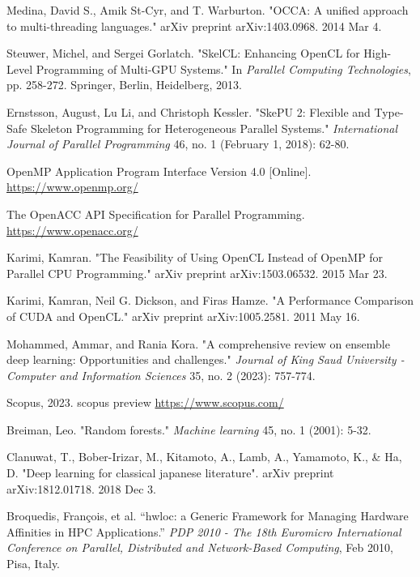 \documentclass[13pt]{article}
\begin{document}
\begin{thebibliography}{9}
    Medina, David S., Amik St-Cyr, and T. Warburton. 
    "OCCA: A unified approach to multi-threading languages."
    arXiv preprint arXiv:1403.0968. 2014 Mar 4.


    Steuwer, Michel, and Sergei Gorlatch.
    "SkelCL: Enhancing OpenCL for High-Level Programming of Multi-GPU Systems."
    In \textit{Parallel Computing Technologies}, pp. 258-272. Springer, Berlin, Heidelberg, 2013.

    Ernstsson, August, Lu Li, and Christoph Kessler.
    "SkePU 2: Flexible and Type-Safe Skeleton Programming for Heterogeneous Parallel Systems."
    \textit{International Journal of Parallel Programming} 46, no. 1 (February 1, 2018): 62-80.


    OpenMP Application Program Interface Version 4.0 [Online].
    \url{https://www.openmp.org/}


    The OpenACC API Specification for Parallel Programming.
    \url{https://www.openacc.org/}

    Karimi, Kamran.
    "The Feasibility of Using OpenCL Instead of OpenMP for Parallel CPU Programming."
    arXiv preprint arXiv:1503.06532. 2015 Mar 23.


    Karimi, Kamran, Neil G. Dickson, and Firas Hamze.
    "A Performance Comparison of CUDA and OpenCL."
    arXiv preprint arXiv:1005.2581. 2011 May 16.

    Mohammed, Ammar, and Rania Kora.
    "A comprehensive review on ensemble deep learning: Opportunities and challenges."
    \textit{Journal of King Saud University - Computer and Information Sciences} 35, no. 2 (2023): 757-774.

    Scopus, 2023. scopus preview
    \url{https://www.scopus.com/}

    Breiman, Leo.
    "Random forests."
    \textit{Machine learning} 45, no. 1 (2001): 5-32.

    Clanuwat, T., Bober-Irizar, M., Kitamoto, A., Lamb, A., Yamamoto, K., \& Ha, D.
    "Deep learning for classical japanese literature".
    arXiv preprint arXiv:1812.01718. 2018 Dec 3.

    Broquedis, François, et al. 
    ``hwloc: a Generic Framework for Managing Hardware Affinities in HPC Applications.''
    \textit{PDP 2010 - The 18th Euromicro International Conference on Parallel, Distributed and Network-Based Computing}, Feb 2010, Pisa, Italy.
    
\end{thebibliography}
\end{document}
